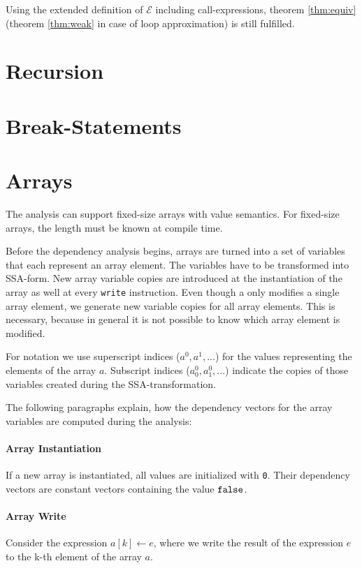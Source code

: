 \begin{lemma}
Using the extended definition of $\mathcal{E}$ including call-expressions, theorem \ref{thm:equiv} (theorem \ref{thm:weak} in case of loop approximation) is still fulfilled.
\end{lemma}

\section{Recursion}

\section{Break-Statements}

\section{Arrays}
The analysis can support fixed-size arrays with value semantics. For fixed-size arrays, the length must be known at compile time.

Before the dependency analysis begins, arrays are turned into a set of variables that each represent an array element. The variables have to be transformed into SSA-form. New array variable copies are introduced at the instantiation of the array as well at every \texttt{write} instruction. Even though a only modifies a single array element, we generate new variable copies for all array elements. This is necessary, because in general it is not possible to know which array element is modified.

For notation we use superscript indices ($a^0, a^1, ...$) for the values representing the elements of the array $a$. Subscript indices ($a^0_0, a^0_1,...$) indicate the copies of those variables created during the SSA-transformation.

The following paragraphs explain, how the dependency vectors for the array variables are computed during the analysis:

\paragraph{Array Instantiation}
If a new array is instantiated, all values are initialized with \texttt{0}. Their dependency vectors are constant vectors containing the value $\mathtt{false}$.

\paragraph{Array Write}
Consider the expression $a[k] \leftarrow e$, where we write the result of the expression $e$ to the k-th element of the array $a$.

